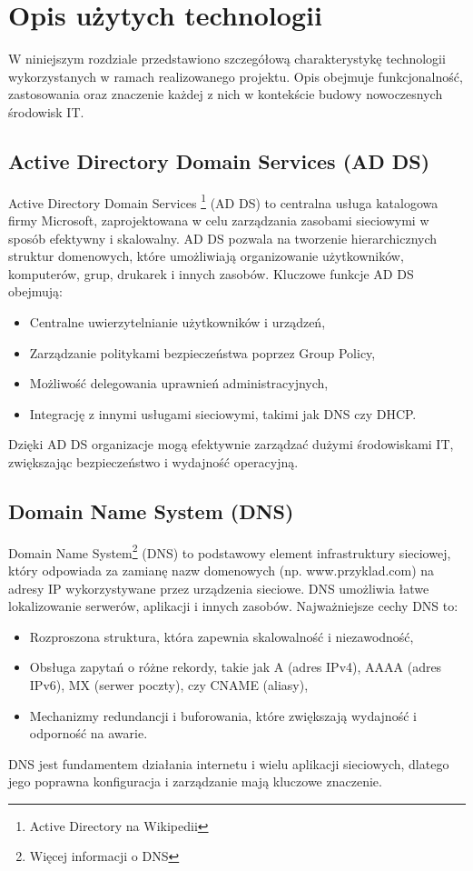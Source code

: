 \newpage
\section{Opis użytych technologii}		%


W niniejszym rozdziale przedstawiono szczegółową charakterystykę technologii wykorzystanych w ramach realizowanego projektu. Opis obejmuje funkcjonalność, zastosowania oraz znaczenie każdej z nich w kontekście budowy nowoczesnych środowisk IT.

\subsection{Active Directory Domain Services (AD DS)}
Active Directory Domain Services \footnote{Active Directory na Wikipedii\cite{ActiveDirectory}} (AD DS) to centralna usługa katalogowa firmy Microsoft, zaprojektowana w celu zarządzania zasobami sieciowymi w sposób efektywny i skalowalny. AD DS pozwala na tworzenie hierarchicznych struktur domenowych, które umożliwiają organizowanie użytkowników, komputerów, grup, drukarek i innych zasobów. Kluczowe funkcje AD DS obejmują:
\begin{itemize}
	\item Centralne uwierzytelnianie użytkowników i urządzeń,
    \item Zarządzanie politykami bezpieczeństwa poprzez Group Policy,
    \item Możliwość delegowania uprawnień administracyjnych,
    \item Integrację z innymi usługami sieciowymi, takimi jak DNS czy DHCP.
\end{itemize}
Dzięki AD DS organizacje mogą efektywnie zarządzać dużymi środowiskami IT, zwiększając bezpieczeństwo i wydajność operacyjną.

\subsection{Domain Name System (DNS)}
Domain Name System\footnote{Więcej informacji o DNS\cite{dns}} (DNS) to podstawowy element infrastruktury sieciowej, który odpowiada za zamianę nazw domenowych (np. www.przyklad.com) na adresy IP wykorzystywane przez urządzenia sieciowe. DNS umożliwia łatwe lokalizowanie serwerów, aplikacji i innych zasobów. Najważniejsze cechy DNS to:
\begin{itemize}
	\item Rozproszona struktura, która zapewnia skalowalność i niezawodność,
\item Obsługa zapytań o różne rekordy, takie jak A (adres IPv4), AAAA (adres IPv6), MX (serwer poczty), czy CNAME (aliasy),
\item Mechanizmy redundancji i buforowania, które zwiększają wydajność i odporność na awarie.
\end{itemize}
DNS jest fundamentem działania internetu i wielu aplikacji sieciowych, dlatego jego poprawna konfiguracja i zarządzanie mają kluczowe znaczenie.

